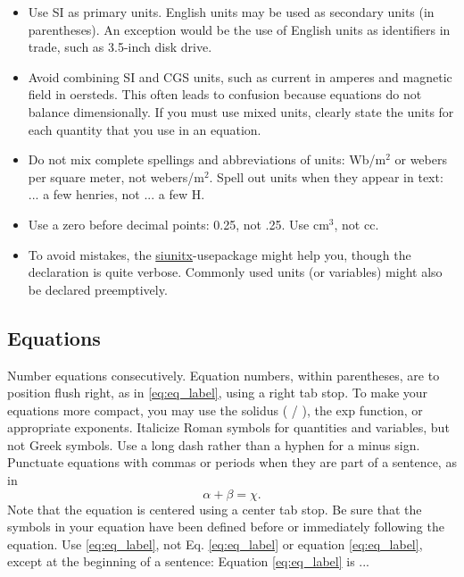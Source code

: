 \documentclass[11pt]{report}
\numberwithin{equation}{chapter}		%
\numberwithin{figure}{chapter}			%
\numberwithin{table}{chapter}			%
\begin{document}
	\begin{itemize}
	\item Use SI as primary units. English units may be used as secondary units (in parentheses). An exception would be the use of English units as identifiers in trade, such as 3.5-inch disk drive.
	\item Avoid combining SI and CGS units, such as current in amperes and magnetic field in oersteds. This often leads to confusion because equations do not balance dimensionally. If you must use mixed units, clearly state the units for each quantity that you use in an equation.
	\item Do not mix complete spellings and abbreviations of units: Wb/m$^2$ or webers per square meter, not webers/m$^2$.  Spell out units when they appear in text: ... a few henries, not ... a few H.
	\item Use a zero before decimal points: 0.25, not .25. Use cm$^3$, not cc. 
	\item To avoid mistakes, the \href{http://mirrors.ibiblio.org/CTAN/macros/latex/contrib/siunitx/siunitx.pdf}{siunitx}-usepackage might help you, though the declaration is quite verbose. Commonly used units (or variables) might also be declared preemptively. 
	\end{itemize}

	\subsection{Equations}
	Number equations consecutively. Equation numbers, within parentheses, are to position flush right, as in \eqref{eq:eq_label}, using a right tab stop. To make your equations more compact, you may use the solidus ( / ), the exp function, or appropriate exponents. Italicize Roman symbols for quantities and variables, but not Greek symbols. Use a long dash rather than a hyphen for a minus sign. Punctuate equations with commas or periods when they are part of a sentence, as in
	\begin{equation}\label{eq:eq_label}
	    \alpha + \beta = \chi.
	\end{equation}
	Note that the equation is centered using a center tab stop. Be sure that the symbols in your equation have been defined before or immediately following the equation. Use \eqref{eq:eq_label}, not Eq. \eqref{eq:eq_label} or equation \eqref{eq:eq_label}, except at the beginning of a sentence: Equation \eqref{eq:eq_label} is ...
\end{document}
